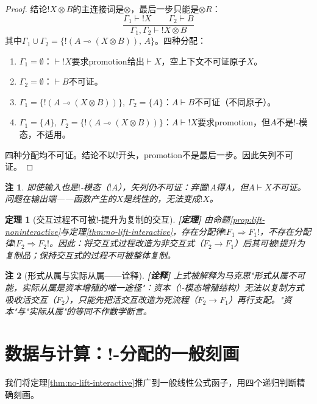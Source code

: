 \documentclass[11pt,a4paper]{article}
\newtheorem{theorem}{定理}
\newtheorem{remark}{注}
\newcommand{\lvl}[1]{\hfill\textbf{\footnotesize[#1]}}
\newcommand{\lvP}{\lvl{定理}}
\newcommand{\lvI}{\lvl{诠释}}
\newcommand{\lolli}{\multimap}
\newcommand{\bang}{{!}}
\newcommand{\tensor}{\otimes}
\begin{document}
\begin{proof}
结论$\bang X\tensor B$的主连接词是$\tensor$，最后一步只能是$\tensor R$：
$$\frac{\Gamma_1\vdash\bang X\qquad \Gamma_2\vdash B}{\Gamma_1,\Gamma_2\vdash\bang X\tensor B}$$
其中$\Gamma_1\cup\Gamma_2=\{\bang(A\lolli(X\tensor B)),\,A\}$。四种分配：
\begin{enumerate}
  \item $\Gamma_1=\emptyset$：$\vdash\bang X$要求promotion给出$\vdash X$，空上下文不可证原子$X$。
  \item $\Gamma_2=\emptyset$：$\vdash B$不可证。
  \item $\Gamma_1=\{\bang(A\lolli(X\tensor B))\},\ \Gamma_2=\{A\}$：$A\vdash B$不可证（不同原子）。
  \item $\Gamma_1=\{A\},\ \Gamma_2=\{\bang(A\lolli(X\tensor B))\}$：$A\vdash\bang X$要求promotion，但$A$不是$\bang$-模态，不适用。
\end{enumerate}
四种分配均不可证。结论不以$\bang$开头，promotion不是最后一步。因此矢列不可证。
\end{proof}

\begin{remark}
即使输入也是$\bang$-模态（$\bang A$），矢列仍不可证：弃置$\bang A$得$A$，但$A\vdash X$不可证。问题在输出端——函数产生的$X$是线性的，无法变成$\bang X$。
\end{remark}

\begin{theorem}[交互过程不可被!-提升为复制的交互]\label{thm:subsumption}\lvP
由命题\ref{prop:lift-noninteractive}与定理\ref{thm:no-lift-interactive}，存在分配律$\bang F_1\Rightarrow F_1\bang$，不存在分配律$\bang F_2\Rightarrow F_2\bang$。因此：将交互式过程改造为非交互式（$F_2\to F_1$）后其可被$\bang$提升为复制品；保持交互式的过程不可被整体复制。
\end{theorem}

\begin{remark}[形式从属与实际从属——诠释]\lvI
上式被解释为马克思"形式从属不可能，实际从属是资本增殖的唯一途径"：资本（$\bang$-模态增殖结构）无法以复制方式吸收活交互（$F_2$），只能先把活交互改造为死流程（$F_2\to F_1$）再行支配。"资本"与"实际从属"的等同不作数学断言。
\end{remark}

\section{数据与计算：!-分配的一般刻画}

我们将定理\ref{thm:no-lift-interactive}推广到一般线性公式函子，用四个递归判断精确刻画。
\end{document}
